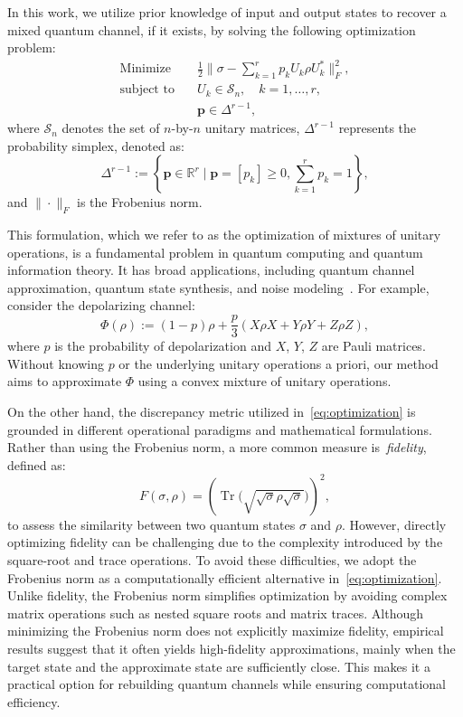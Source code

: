 \documentclass[onefignum,onetabnum]{siamart220329}
\begin{document}
    In this work, we utilize prior knowledge of input and output states to recover a mixed quantum channel, if it exists, by solving the following optimization problem:  
    \begin{subequations}\label{eq:optimization}
    \begin{align}
    \text{Minimize} & \quad \frac{1}{2} \| \sigma - \sum_{k=1}^r p_k U_k \rho U_k^* \|_F^2, \\
    \text{subject to} & \quad U_k \in \mathcal{S}_n, \quad k = 1, \ldots, r, \\
    & \quad \mathbf{p} \in \Delta^{r-1},
    \end{align}
    \end{subequations}
    where $\mathcal{S}_n$ denotes the set of $n$-by-$n$ unitary matrices, $\Delta^{r-1}$ represents the probability simplex, denoted as:
    \begin{equation}\label{eq:simplex}
    \Delta^{r-1} := \left\{ \mathbf{p} \in \mathbb{R}^r \mid \mathbf{p} = [p_k] \geq 0, \sum_{k=1}^r p_k = 1 \right\},
    \end{equation}
    and $\|\cdot\|_F$ is the Frobenius norm.  
    
    This formulation, which we refer to as the optimization of mixtures of unitary operations, is a fundamental problem in quantum computing and quantum information theory. It has broad applications, including quantum channel approximation, quantum state synthesis, and noise modeling~\cite{Nielsen2010, Watrous2018,Brun2020}. For example, consider the depolarizing channel:  
    \begin{equation}\label{eq:depolar}
    \Phi(\rho) := (1-p) \rho + \frac{p}{3}\left(X \rho X + Y \rho Y + Z \rho Z\right),
    \end{equation}
    where $p$ is the probability of depolarization and $X$, $Y$, $Z$ are Pauli matrices. Without knowing $p$ or the underlying unitary operations a priori, our method aims to approximate $\Phi$ using a convex mixture of unitary operations.  
    
    On the other hand, the discrepancy metric utilized in~\eqref{eq:optimization} is grounded in different operational paradigms and mathematical formulations. Rather than using the Frobenius norm,  a more common measure is~\emph{fidelity}, defined as:  
    \[
    F(\sigma, {\rho}) = \left( \operatorname{Tr} \big( \sqrt{\sqrt{\sigma} {\rho} \sqrt{\sigma}} \big) \right)^2,
    \]  
    to assess the similarity between two quantum states $\sigma$ and $\rho$. However, directly optimizing fidelity can be challenging due to the complexity introduced by the square-root and trace operations. To avoid these difficulties, we adopt the Frobenius norm as a computationally efficient alternative in~\eqref{eq:optimization}. Unlike fidelity, the Frobenius norm simplifies optimization by avoiding complex matrix operations such as nested square roots and matrix traces. Although minimizing the Frobenius norm does not explicitly maximize fidelity, empirical results suggest that it often yields high-fidelity approximations, mainly when the target state and the approximate state are sufficiently close. This makes it a practical option for rebuilding quantum channels while ensuring computational efficiency.
    
\end{document}
